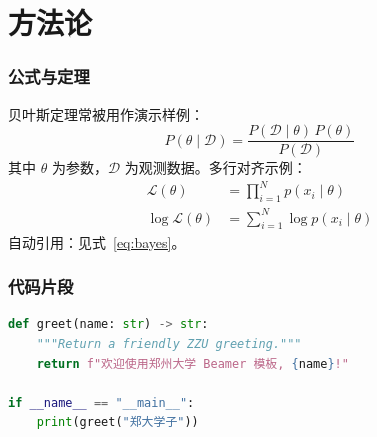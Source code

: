 \section{方法论}

\begin{frame}
  \frametitle{公式与定理}
  贝叶斯定理常被用作演示样例：
  \begin{equation}
    P(\theta \mid \mathcal{D}) = \frac{P(\mathcal{D} \mid \theta)\,P(\theta)}{P(\mathcal{D})}
    \label{eq:bayes}
  \end{equation}
  其中 $\theta$ 为参数，$\mathcal{D}$ 为观测数据。多行对齐示例：
  \begin{align}
    \mathcal{L}(\theta) &= \prod_{i=1}^{N} p(x_i \mid \theta) \\
    \log \mathcal{L}(\theta) &= \sum_{i=1}^{N} \log p(x_i \mid \theta)
  \end{align}
  \pause
  自动引用：见式~\eqref{eq:bayes}。
\end{frame}

\begin{frame}[fragile]
  \frametitle{代码片段}
  \begin{lstlisting}[language=Python, caption={最小可运行的 Python 片段}]
def greet(name: str) -> str:
    """Return a friendly ZZU greeting."""
    return f"欢迎使用郑州大学 Beamer 模板, {name}!"

if __name__ == "__main__":
    print(greet("郑大学子"))
  \end{lstlisting}
\end{frame}

